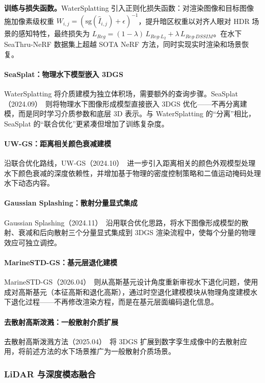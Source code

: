 \textbf{训练与损失函数。}WaterSplatting 引入正则化损失函数：对渲染图像和目标图像施加像素级权重 $W_{i,j} = (\text{sg}(\hat{I}_{i,j}) + \epsilon)^{-1}$，提升暗区权重以对齐人眼对 HDR 场景的感知特性，最终损失为 $L_{Reg} = (1-\lambda)\,L_{Reg\text{-}L_2} + \lambda\,L_{Reg\text{-}DSSIM}$。在水下 SeaThru-NeRF 数据集上超越 SOTA NeRF 方法，同时实现实时渲染和场景恢复。

\paragraph{SeaSplat：物理水下模型嵌入 3DGS}
WaterSplatting 将介质建模为独立体积场，需要额外的查询步骤。SeaSplat（2024.09）~\cite{2409_17345}则将物理水下图像形成模型直接嵌入 3DGS 优化——不再分离建模，而是同时学习介质参数和底层 3D 表示。与 WaterSplatting 的“分离”相比，SeaSplat 的“联合优化”更紧凑但增加了训练复杂度。

\paragraph{UW-GS：距离相关颜色衰减建模}
沿联合优化路线，UW-GS（2024.10）~\cite{2410_01517}进一步引入距离相关的颜色外观模型处理水下颜色衰减的深度依赖性，并增加基于物理的密度控制策略和二值运动掩码处理水下动态内容。

\paragraph{Gaussian Splashing：散射分量显式集成}
Gaussian Splashing（2024.11）~\cite{2411_19588}沿用联合优化思路，将水下图像形成模型的散射、衰减和后向散射三个分量显式集成到 3DGS 渲染流程中，使每个分量的物理效应可独立调控。

\paragraph{MarineSTD-GS：基元层退化建模}
MarineSTD-GS（2026.04）~\cite{2604_23551}则从高斯基元设计角度重新审视水下退化问题，使用成对高斯基元（本征高斯和退化高斯），通过时空退化建模模块从物理角度建模水下退化过程——不再修改渲染方程，而是在基元层面编码退化信息。

\paragraph{去散射高斯泼溅：一般散射介质扩展}
去散射高斯泼溅方法（2025.04）~\cite{2504_02278}将 3DGS 扩展到数字孪生成像中的去散射应用，将前述方法的水下场景推广为一般散射介质场景。

\subsubsection{LiDAR 与深度模态融合}

